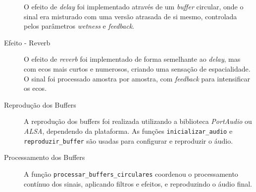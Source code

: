 \begin{description}
O efeito de \textit{delay} foi implementado através de um \textit{buffer} circular, onde o sinal era misturado com uma versão atrasada de si mesmo, controlada pelos parâmetros \textit{wetness} e \textit{feedback}.

\item [Efeito - Reverb]

O efeito de \textit{reverb} foi implementado de forma semelhante ao \textit{delay}, mas com ecos mais curtos e numerosos, criando uma sensação de espacialidade. O sinal foi processado amostra por amostra, com \textit{feedback} para intensificar os ecos.

\item [Reprodução dos Buffers]

A reprodução dos buffers foi realizada utilizando a biblioteca \textit{PortAudio} ou \textit{ALSA}, dependendo da plataforma. As funções \verb|inicializar_audio| e \verb|reproduzir_buffer| são usadas para configurar e reproduzir o áudio.

\item [Processamento dos Buffers]

A função \verb|processar_buffers_circulares| coordenou o processamento contínuo dos sinais, aplicando filtros e efeitos, e reproduzindo o áudio final.
\end{description}




